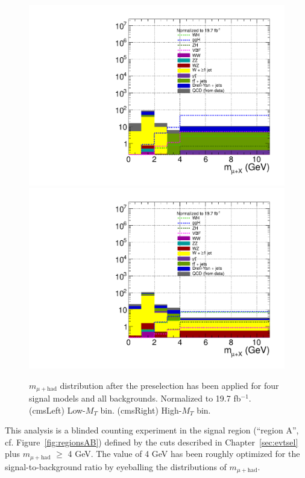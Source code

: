 \begin{figure}[hbtp]
  \begin{center}
    \includegraphics[width=\cmsFigWidth]{figures/sigVsBkg_muHadMass_lowMT_v87}
    \includegraphics[width=\cmsFigWidth]{figures/sigVsBkg_muHadMass_highMT_v87}
    \caption{$m_{\mu+\text{had}}$ distribution after the preselection has been applied for four signal models and all backgrounds. Normalized to 19.7 fb$^{-1}$. (cmsLeft) Low-$M_{T}$ bin. (cmsRight) High-$M_{T}$ bin.}
    \label{fig:muhad-mass-MC-region-A}
  \end{center}
\end{figure}

This analysis is a blinded counting experiment in the signal region (``region A'', cf. Figure~\ref{fig:regionsAB}) defined by the cuts described in Chapter~\ref{sec:evtsel} plus $m_{\mu+\text{had}}$ $\geq$ 4 GeV.  The value of 4 GeV has been roughly optimized for the signal-to-background ratio by eyeballing the distributions of $m_{\mu+\text{had}}$.

